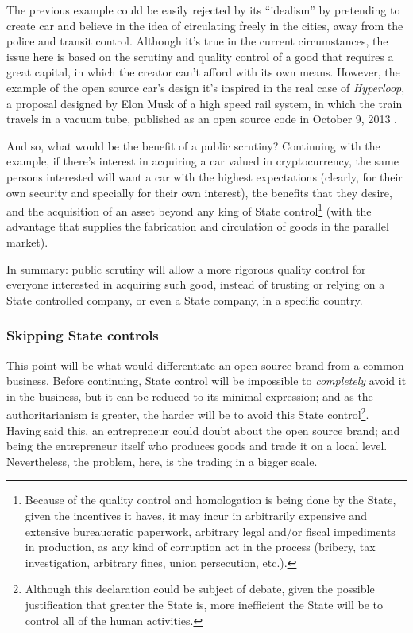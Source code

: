 \documentclass[12pt,a4paper]{article}
\begin{document}
The previous example could be easily rejected by its “idealism” by pretending to create car and believe in the idea of circulating freely in the cities, away from the police and transit control. Although it's true in the current circumstances, the issue here is based on the scrutiny and quality control of a good that requires a great capital, in which the creator can't afford with its own means. However, the example of the open source car's design it's inspired in the real case of \textit{Hyperloop}, a proposal designed by Elon Musk of a high speed rail system, in which the train travels in a vacuum tube, published as an open source code in October 9, 2013 \cite{hyperloop}.

And so, what would be the benefit of a public scrutiny? Continuing with the example, if there's interest in acquiring a car valued in cryptocurrency, the same persons interested will want a car with the highest expectations (clearly, for their own security and specially for their own interest), the benefits that they desire, and the acquisition of an asset beyond any king of State control\footnote{Because of the quality control and homologation is being done by the State, given the incentives it haves, it may incur in arbitrarily expensive and extensive bureaucratic paperwork, arbitrary legal and/or fiscal impediments in production, as any kind of corruption act in the process (bribery, tax investigation, arbitrary fines, union persecution, etc.).} (with the advantage that supplies the fabrication and circulation of goods in the parallel market).

In summary: public scrutiny will allow a more rigorous quality control for everyone interested in acquiring such good, instead of trusting or relying on a State controlled company, or even a State company, in a specific country.

\subsubsection{Skipping State controls}
This point will be what would differentiate an open source brand from a common business. Before continuing, State control will be impossible to \textit{completely} avoid it in the business, but it can be reduced to its minimal expression; and as the authoritarianism is greater, the harder will be to avoid this State control\footnote{Although this declaration could be subject of debate, given the possible justification that greater the State is, more inefficient the State will be to control all of the human activities.}. Having said this, an entrepreneur could doubt about the open source brand; and being the entrepreneur itself who produces goods and trade it on a local level. Nevertheless, the problem, here, is the trading in a bigger scale.
\end{document}
